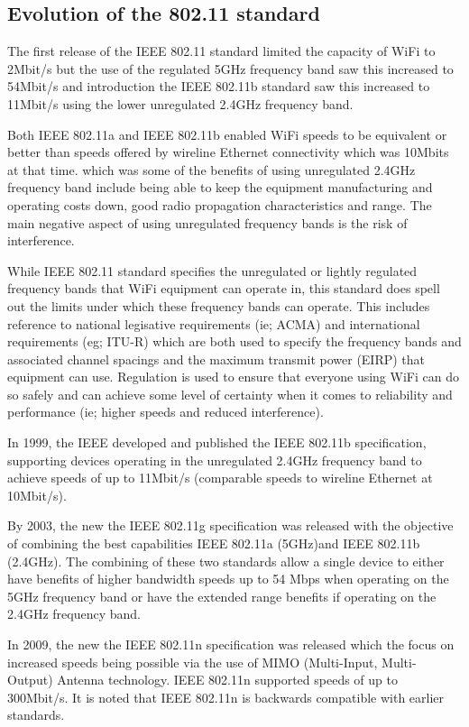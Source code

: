 \subsection{Evolution of the 802.11 standard}

The first release of the IEEE 802.11 standard
limited the capacity of WiFi to 2Mbit/s but the use of the regulated
5GHz frequency band saw this increased to 54Mbit/s and introduction the
IEEE 802.11b standard saw this increased to 11Mbit/s using the lower
unregulated 2.4GHz frequency band.

Both IEEE 802.11a and IEEE 802.11b enabled WiFi speeds to be equivalent
or better than speeds offered by wireline Ethernet connectivity
which was  10Mbits at that time. which was some of the benefits of
using unregulated 2.4GHz frequency band include being able to keep the
equipment manufacturing and operating costs down, good radio propagation
characteristics and range.  The main negative aspect of using unregulated
frequency bands is the risk of interference.

While IEEE 802.11 standard specifies the unregulated or lightly regulated
frequency bands that WiFi equipment can operate in, this standard does
spell out the limits under which these frequency bands can operate.
This includes reference to national legisative requirements (ie; ACMA)
and international requirements (eg; ITU-R) which are both used to specify
the frequency bands and associated channel spacings and the maximum
transmit power (EIRP) that equipment can use. Regulation is used to
ensure that everyone using WiFi can do so safely and can achieve some
level of certainty when it comes to reliability and performance (ie;
higher speeds and reduced interference).

In 1999, the IEEE developed and published the IEEE 802.11b specification,
supporting devices operating in the unregulated 2.4GHz frequency band to
achieve speeds of up to 11Mbit/s (comparable speeds to wireline Ethernet
at 10Mbit/s).

By 2003, the new the IEEE 802.11g specification was released with the
objective of combining the best capabilities IEEE 802.11a (5GHz)and IEEE
802.11b (2.4GHz). The combining of these two standards allow a single
device to either have benefits of higher bandwidth speeds up to 54 Mbps
when operating on the 5GHz frequency band or have the extended range
benefits if operating on the 2.4GHz frequency band.

In 2009, the new the IEEE 802.11n specification was released which the
focus on increased speeds being possible via the use of MIMO (Multi-Input,
Multi-Output) Antenna technology. IEEE 802.11n supported speeds of up
to 300Mbit/s. It is noted that IEEE 802.11n is backwards compatible with
earlier standards.

